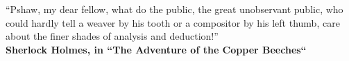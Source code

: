 
\pretextualchapter{}
\vspace{8cm}
\begin{flushright}
\textnormal{``Pshaw, my dear fellow, what do the public, the great unobservant public, who could hardly tell a weaver by his tooth or a compositor by his left thumb, care about the finer shades of analysis and deduction!'' \\
	\bfseries Sherlock Holmes, in ``The Adventure of the Copper Beeches``}
\end{flushright}


